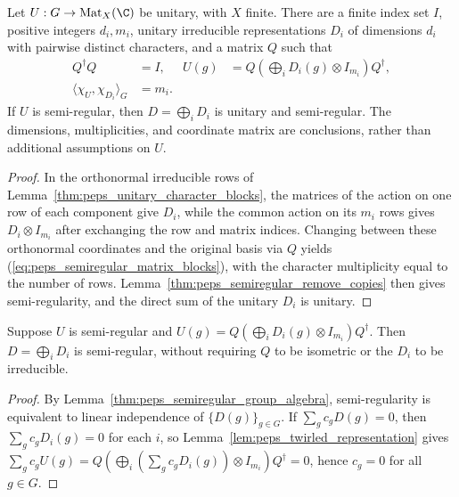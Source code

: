 \begin{lemma}%
    \label{thm:peps_semiregular_matrix_blocks}
    \leanok
    Let $U:G\to\operatorname{Mat}_X(\C)$ be unitary, with $X$ finite.
    There are a finite index set $I$, positive integers $d_i,m_i$,
    unitary irreducible representations $D_i$ of dimensions $d_i$ with
    pairwise distinct characters, and a matrix $Q$ such that
    \begin{align}
        Q^\dagger Q                       & =I,
                                          & U(g)  & =Q\left(\bigoplus_iD_i(g)\otimes I_{m_i}\right)Q^\dagger,
        \label{eq:peps_semiregular_matrix_blocks}                                                             \\
        \langle\chi_U,\chi_{D_i}\rangle_G & =m_i.
    \end{align}
    If $U$ is semi-regular, then $D=\bigoplus_iD_i$ is unitary and
    semi-regular. The dimensions, multiplicities, and coordinate matrix
    are conclusions, rather than additional assumptions on $U$.
\end{lemma}
\begin{proof}\leanok
    In the orthonormal irreducible rows of
    Lemma~\ref{thm:peps_unitary_character_blocks}, the matrices of the
    action on one row of each component give $D_i$, while the common action on
    its $m_i$ rows gives $D_i\otimes I_{m_i}$ after exchanging the row
    and matrix indices. Changing between these orthonormal coordinates
    and the original basis via $Q$ yields
    (\ref{eq:peps_semiregular_matrix_blocks}), with the character multiplicity
    equal to the number of rows.
    Lemma~\ref{thm:peps_semiregular_remove_copies} then gives semi-regularity,
    and the direct sum of the unitary $D_i$ is unitary.
\end{proof}

\begin{lemma}%
    \label{thm:peps_semiregular_remove_copies}
    \leanok
    Suppose $U$ is semi-regular and
    $U(g)=Q(\bigoplus_iD_i(g)\otimes I_{m_i})Q^\dagger$.
    Then $D=\bigoplus_iD_i$ is semi-regular, without requiring $Q$ to be
    isometric or the $D_i$ to be irreducible.
\end{lemma}
\begin{proof}\leanok
    By Lemma~\ref{thm:peps_semiregular_group_algebra}, semi-regularity is
    equivalent to linear independence of $\{D(g)\}_{g\in G}$. If
    $\sum_gc_gD(g)=0$, then $\sum_gc_gD_i(g)=0$ for each $i$, so
    Lemma~\ref{lem:peps_twirled_representation} gives
    $\sum_gc_gU(g)=Q(\bigoplus_i(\sum_gc_gD_i(g))\otimes I_{m_i})Q^\dagger=0$,
    hence $c_g=0$ for all $g\in G$.
\end{proof}


